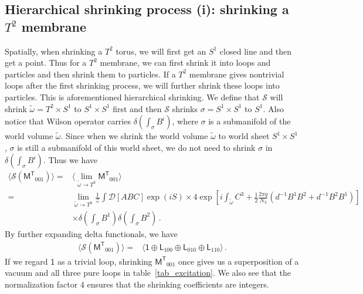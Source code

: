 \documentclass[11pt,nofootinbib,preprint]{revtex4-1}
\begin{document}
\subsection{Hierarchical shrinking process (i): shrinking a   $T^2$ membrane\label{section_shrinking_hier}}
Spatially, when shrinking a $T^2$ torus, we will first get an $S^1$ closed line and then get a point. Thus for a $T^2$ membrane, we can first shrink it into loops and particles and then shrink them to particles. If a $T^2$ membrane gives nontrivial loops after the first shrinking process, we will further shrink these loops into  particles. This is  aforementioned hierarchical shrinking. We define that $\mathcal{S}$ will shrink $\tilde{\omega}=T^2\times S^1$ to $S^1\times S^1$ first and then $\mathcal{S}$ shrinks $\sigma=S^1\times S^1$ to $S^1$. Also notice that Wilson operator carries $\delta \left( \int_{\sigma}{B^i} \right)$, where $\sigma$ is a submanifold of the world volume $\tilde{\omega}$. Since when we shrink the world volume $\tilde{\omega}$ to world sheet $S^1\times S^1$, $\sigma$ is still a submanifold of this world sheet, we do not need to shrink $\sigma$ in $\delta \left( \int_{\sigma}{B^i} \right)$. Thus we have
\begin{align}
	\langle \mathcal{S} \left( \mathsf{M^T}_{001} \right) \rangle =&\langle \underset{\tilde{\omega} \rightarrow T^2}{\lim}\mathsf{M^T}_{001} \rangle \nonumber
	\\
	=&\underset{\tilde{\omega} \rightarrow T^2}{\lim}\frac{1}{\mathcal{Z}}\int{\mathcal{D} \left[ ABC\right] \exp \left( iS \right)}\times 4\exp \left[ i\int_{\tilde{\omega}}{C^3+\frac{1}{2}\frac{2\pi q}{N_3}\left( d^{-1}B^1B^2+d^{-1}B^2B^1 \right)} \right] \nonumber
	\\
	&\times\delta \left( \int_{\sigma}{B^1} \right) \delta \left( \int_{\sigma}{B^2} \right) \,.
\end{align}
By further expanding delta functionals, we have
\begin{align}
	\langle \mathcal{S} \left( \mathsf{M^T}_{001} \right) \rangle 
	=&\langle \mathsf{1}\oplus \mathsf{L}_{100}\oplus \mathsf{L}_{010}\oplus \mathsf{L}_{110} \rangle \,.
\end{align}
If we regard $\mathsf{1}$ as a trivial loop, shrinking $\mathsf{M^T}_{001}$ once gives us a superposition of a vacuum and  all three pure loops in table~\ref{tab_excitation}. We also see that the normalization factor $4$ ensures that the shrinking coefficients are integers. 
\end{document}
